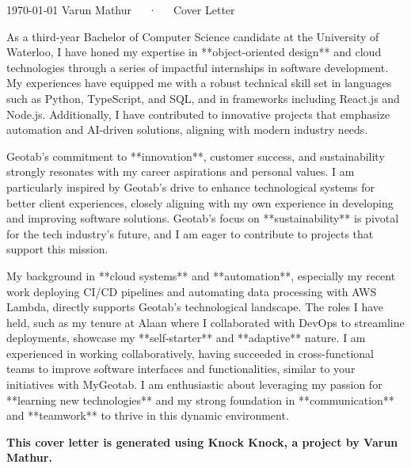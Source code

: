\documentclass[11pt, a4paper]{awesome-cv}
\begin{document}
\makecvheader[C]

\makecvfooter
{\today}
{Varun Mathur~~~·~~~Cover Letter}
{}

\makelettertitle

\begin{cvletter}

As a third-year Bachelor of Computer Science candidate at the University of Waterloo, I have honed my expertise in **object-oriented design** and cloud technologies through a series of impactful internships in software development. My experiences have equipped me with a robust technical skill set in languages such as Python, TypeScript, and SQL, and in frameworks including React.js and Node.js. Additionally, I have contributed to innovative projects that emphasize automation and AI-driven solutions, aligning with modern industry needs.

Geotab's commitment to **innovation**, customer success, and sustainability strongly resonates with my career aspirations and personal values. I am particularly inspired by Geotab’s drive to enhance technological systems for better client experiences, closely aligning with my own experience in developing and improving software solutions. Geotab’s focus on **sustainability** is pivotal for the tech industry's future, and I am eager to contribute to projects that support this mission.

My background in **cloud systems** and **automation**, especially my recent work deploying CI/CD pipelines and automating data processing with AWS Lambda, directly supports Geotab's technological landscape. The roles I have held, such as my tenure at Alaan where I collaborated with DevOps to streamline deployments, showcase my **self-starter** and **adaptive** nature. I am experienced in working collaboratively, having succeeded in cross-functional teams to improve software interfaces and functionalities, similar to your initiatives with MyGeotab. I am enthusiastic about leveraging my passion for **learning new technologies** and my strong foundation in **communication** and **teamwork** to thrive in this dynamic environment.

\textbf{This cover letter is generated using Knock Knock, a project by Varun Mathur.}

\end{cvletter}


\makeletterclosing
\end{document}
